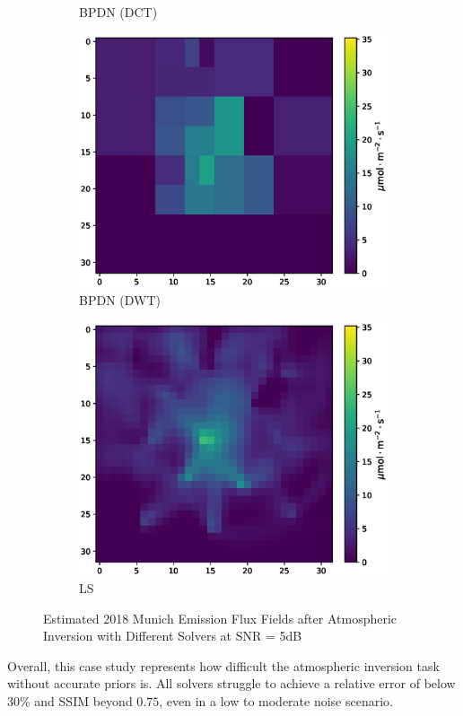 \begin{figure}[htb]
\begin{minipage}[b]{\textwidth}
\begin{subfigure}[b]{0.32\textwidth}
            \caption{BPDN (DCT)}
        \end{subfigure}    
        \begin{subfigure}[b]{0.32\textwidth}
            \includegraphics[width=\textwidth]{figures/06_results/gaussian_plume_example/munich/bp_dwt_snr_5_db.eps}
            \caption{BPDN (DWT)}
        \end{subfigure}
        \begin{subfigure}[b]{0.32\textwidth}
            \includegraphics[width=\textwidth]{figures/06_results/gaussian_plume_example/munich/least_squares_snr_5_db.eps}
            \caption{LS}
        \end{subfigure}
        \caption{Estimated 2018 Munich Emission Flux Fields after Atmospheric Inversion with Different Solvers at SNR = 5dB}
        \label{fig:example_munich_5_dB}
    \end{minipage}
\end{figure}

Overall, this case study represents how difficult the atmospheric inversion task without accurate priors is.
All solvers struggle to achieve a relative error of below $30\%$ and \gls{SSIM} beyond $0.75$, even in a low to moderate noise scenario.

